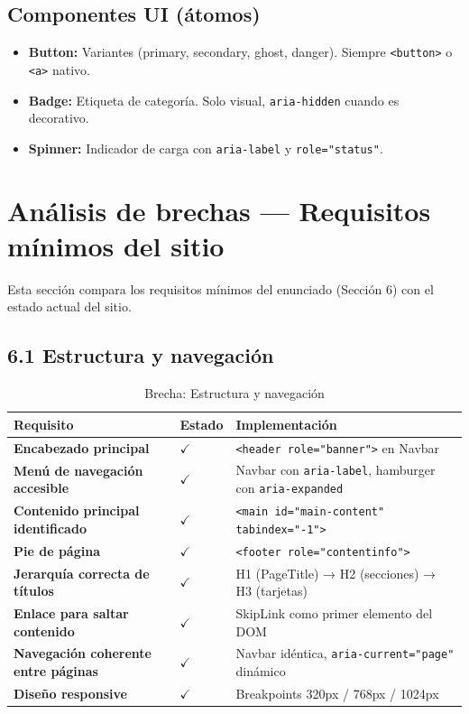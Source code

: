 \documentclass[12pt, a4paper]{article}
\newcommand{\cmark}{\textcolor{successgreen}{$\checkmark$}}
\begin{document}
\subsection{Componentes UI (átomos)}

\begin{itemize}
  \item \textbf{Button:} Variantes (primary, secondary, ghost, danger). Siempre \texttt{<button>} o \texttt{<a>} nativo.
  \item \textbf{Badge:} Etiqueta de categoría. Solo visual, \texttt{aria-hidden} cuando es decorativo.
  \item \textbf{Spinner:} Indicador de carga con \texttt{aria-label} y \texttt{role="status"}.
\end{itemize}

\section{Análisis de brechas --- Requisitos mínimos del sitio}

Esta sección compara los requisitos mínimos del enunciado (Sección 6) con el estado actual del sitio.

\subsection{6.1 Estructura y navegación}

\begin{table}[H]
\centering
\caption{Brecha: Estructura y navegación}
\small
\begin{tabular}{@{}>{\bfseries}p{5cm} >{\centering\arraybackslash}p{2cm} p{6.5cm}@{}}
\toprule
\rowcolor{royalblue!12}
\textbf{Requisito} & \textbf{Estado} & \textbf{Implementación} \\
\midrule
Encabezado principal & \cmark & \texttt{<header role="banner">} en Navbar \\
Menú de navegación accesible & \cmark & Navbar con \texttt{aria-label}, hamburger con \texttt{aria-expanded} \\
Contenido principal identificado & \cmark & \texttt{<main id="main-content" tabindex="-1">} \\
Pie de página & \cmark & \texttt{<footer role="contentinfo">} \\
Jerarquía correcta de títulos & \cmark & H1 (PageTitle) → H2 (secciones) → H3 (tarjetas) \\
Enlace para saltar contenido & \cmark & SkipLink como primer elemento del DOM \\
Navegación coherente entre páginas & \cmark & Navbar idéntica, \texttt{aria-current="page"} dinámico \\
Diseño responsive & \cmark & Breakpoints 320px / 768px / 1024px \\
\bottomrule
\end{tabular}
\end{table}
\end{document}
